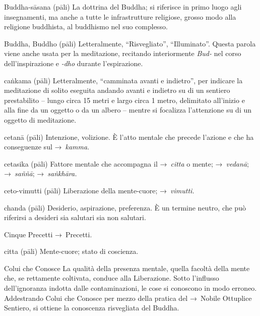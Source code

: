 \begin{glossarydescription}
\item[Buddha-sāsana] (pāli) La dottrina del Buddha; si riferisce in primo luogo
  agli insegnamenti, ma anche a tutte le infrastrutture religiose, grosso modo
  alla religione buddhista, al buddhismo nel suo complesso.

\item[Buddha, Buddho] (pāli) Letteralmente, ``Risvegliato'', ``Illuminato''.
  Questa parola viene anche usata per la meditazione, recitando interiormente
  \emph{Bud-} nel corso dell'inspirazione e \emph{-dho} durante l'espirazione.


\item[caṅkama] (pāli) Letteralmente, ``camminata avanti e indietro'', per
  indicare la meditazione di solito eseguita andando avanti e indietro su di un
  sentiero prestabilito -- lungo circa 15 metri e largo circa 1 metro,
  delimitato all'inizio e alla fine da un oggetto o da un albero -- mentre si
  focalizza l'attenzione su di un oggetto di meditazione.

\item[cetanā] (pāli) Intenzione, volizione. È l'atto mentale che precede
  l'azione e che ha conseguenze sul →~\emph{kamma}.

\item[cetasika] (pāli) Fattore mentale che accompagna il →~\emph{citta} o mente;
  →~\emph{vedanā}; →~\emph{saññā}; →~\emph{saṅkhāra.}

\item[ceto-vimutti] (pāli) Liberazione della mente-cuore; →~\emph{vimutti.}

\item[chanda] (pāli) Desiderio, aspirazione, preferenza. È un termine neutro,
  che può riferirsi a desideri sia salutari sia non salutari.

\item[Cinque Precetti] →~Precetti.

\item[citta] (pāli) Mente-cuore; stato di coscienza.

\item[Colui che Conosce] La qualità della presenza mentale, quella facoltà della
  mente che, se rettamente coltivata, conduce alla Liberazione. Sotto l'influsso
  dell'ignoranza indotta dalle contaminazioni, le cose si conoscono in modo
  erroneo. Addestrando Colui che Conosce per mezzo della pratica del →~Nobile
  Ottuplice Sentiero, si ottiene la conoscenza risvegliata del Buddha.


\end{glossarydescription}
